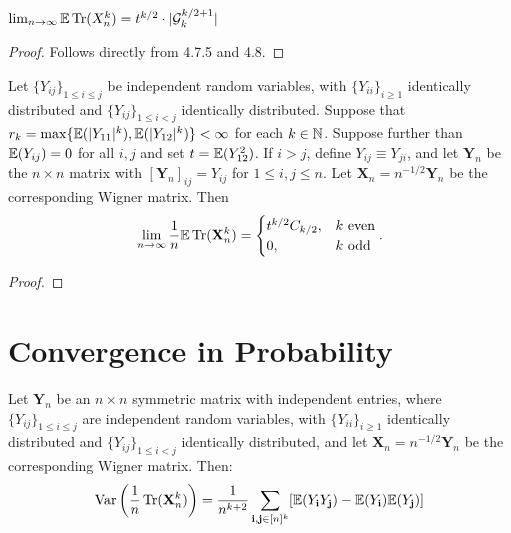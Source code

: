 \begin{proposition}%
  \label{prop:trace_ev_limit_equals_t_special_g}
  \notready
  $\lim_{n\to\infty} \mathbb{E}\operatorname{Tr}(X_n^k) = t^{k/2}\cdot|\mathcal{G}_k^{k/2+1}|$
\end{proposition}

\begin{proof}
  \notready
  Follows directly from 4.7.5 and 4.8.
\end{proof}


\begin{proposition}
  \label{prop:matrix_moments_convergence}
  \notready
  Let $\{Y_{ij}\}_{1\le i\le j}$ be independent random variables, with $\{Y_{ii}\}_{i\ge 1}$ identically distributed and $\{Y_{ij}\}_{1\le i<j}$ identically distributed.  Suppose that $r_k = \max\{\mathbb{E}(|Y_{11}|^k),\mathbb{E}(|Y_{12}|^k)\} <\infty$ for each $k\in\mathbb{N}$.  Suppose further than $\mathbb{E}(Y_{ij})=0$ for all $i,j$ and set $t=\mathbb{E}(Y_{12}^2)$.  If $i>j$, define $Y_{ij} \equiv Y_{ji}$, and let $\mathbf{Y}_n$ be the $n\times n$ matrix with $[\mathbf{Y}_n]_{ij} = Y_{ij}$ for $1\le i,j\le n$.  Let $\mathbf{X}_n = n^{-1/2}\mathbf{Y}_n$ be the corresponding Wigner matrix.  Then
\[
\lim_{n\to\infty} \frac{1}{n}\mathbb{E}\operatorname{Tr}(\mathbf{X}_n^k) = \begin{cases}
  t^{k/2}C_{k/2}, & k\text{ even} \\
  0, & k\text{ odd}
\end{cases}.
\]
\end{proposition}

\begin{proof}
\notready
\end{proof}


\section{Convergence in Probability}


\begin{lemma}
    \label{lem:variance_expansion}
    \notready
    Let $\mathbf{Y}_{n}$ be an $n \times n$ symmetric matrix with independent entries, where $\{Y_{ij}\}_{1\le i\le j}$ are independent random variables, with $\{Y_{ii}\}_{i\ge 1}$ identically distributed and $\{Y_{ij}\}_{1\le i<j}$ identically distributed, and let $\mathbf{X}_{n} = n^{-1 / 2}\mathbf{Y}_{n}$ be the corresponding Wigner matrix. Then:
    $$
    \operatorname{Var}\left(\frac{1}{n}\operatorname{Tr}(\mathbf{X}_{n}^{k})\right) = \frac{1}{n^{k+2}} \sum_{\mathbf{i}, \mathbf{j} \in [n]^{k}} [\mathbb{E}(Y_{\mathbf{i}} Y_{\mathbf{j}}) - \mathbb{E}(Y_{\mathbf{i}})\mathbb{E}(Y_{\mathbf{j}})]
    $$
\end{lemma}

